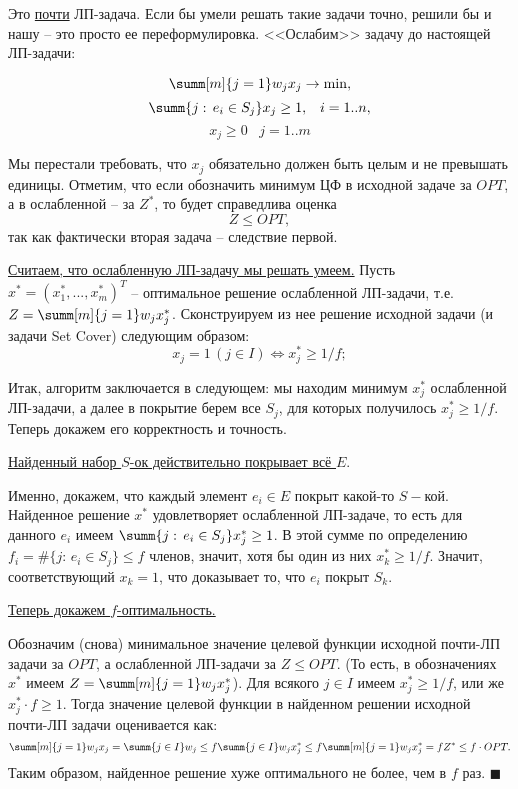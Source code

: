 Это \underline{почти} ЛП-задача. Если бы умели решать такие задачи точно, решили бы и нашу -- это просто ее переформулировка. <<Ослабим>> задачу до настоящей ЛП-задачи:

$$\summ[m]{j=1} w_j x_j \rightarrow \min,$$
$$\summ{j:\, e_i \in S_j} x_j \geq 1, \;\;\; i=1..n,$$
$$x_j \geq 0 \;\;\; j=1..m$$

Мы перестали требовать, что $x_j$ обязательно должен быть целым и не превышать единицы. Отметим, что если обозначить минимум ЦФ в исходной задаче за $OPT$, а в ослабленной -- за $Z^*$, то будет справедлива оценка $$Z \leq OPT,$$ так как фактически вторая задача -- следствие первой.


\underline{Считаем, что ослабленную ЛП-задачу мы решать умеем.} Пусть $x^* = (x_1^*, ..., x_m^*)^T$ -- оптимальное решение ослабленной ЛП-задачи, т.е. $Z = \summ[m]{j=1} w_j x_j^*$. Сконструируем из нее решение исходной задачи (и задачи Set Cover) следующим образом:
$$x_j = 1\, (j \in I) \iff x_j^* \geq 1/f;$$

Итак, алгоритм заключается в следующем: мы находим минимум $x_j^*$ ослабленной ЛП-задачи, а далее в покрытие берем все $S_j$, для которых получилось $x_j^* \geq 1/f$. Теперь докажем его корректность и точность.

\underline{Найденный набор $S$-ок действительно покрывает всё $E$}. 

Именно, докажем, что каждый элемент $e_i \in E$ покрыт какой-то $S-$кой. Найденное решение $x^*$ удовлетворяет ослабленной ЛП-задаче, то есть для данного $e_i$ имеем $\summ{j: \, e_i \in S_j} x_j^* \geq 1$. В этой сумме по определению $f_i = \#\{j: \, e_i \in S_j\} \leq f$ членов, значит, хотя бы один из них $x_k^*\geq 1/f$. Значит, соответствующий $x_k = 1$, что доказывает то, что $e_i$ покрыт $S_k$. 

\underline{Теперь докажем $f$-оптимальность.} 

Обозначим (снова) минимальное значение целевой функции исходной почти-ЛП задачи за $OPT$, а ослабленной ЛП-задачи за $Z \leq OPT$.  (То есть, в обозначениях $x^*$ имеем $Z = \summ[m]{j=1} w_j x_j^*$). Для всякого $j\in I$ имеем $x_j^* \geq 1/f$, или же $x_j^*\cdot f \geq 1$. Тогда значение целевой функции в найденном решении исходной почти-ЛП задачи оценивается как:
$$\summ[m]{j=1} w_j x_j = \summ{j \in I} w_j \leq f \summ{j \in I} w_j x_j^* \leq f \summ[m]{j=1} w_j x_j^* = f Z^* \leq f \cdot OPT.$$ Таким образом, найденное решение хуже оптимального не более, чем в $f$ раз. $\blacksquare$


